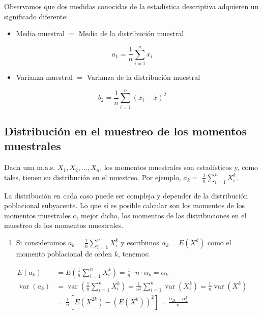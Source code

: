 \documentclass[
]{article}
\providecommand{\tightlist}{%
  \setlength{\itemsep}{0pt}\setlength{\parskip}{0pt}}
\begin{document}
Observamos que dos medidas conocidas de la estadística descriptiva adquieren un significado diferente:

\begin{itemize}
\tightlist
\item
  Media muestral \(=\) Media de la distribución muestral
\end{itemize}

\[
a_{1}=\frac{1}{n} \sum_{i=1}^{n} x_{i}
\]

\begin{itemize}
\tightlist
\item
  Varianza muestral \(=\) Varianza de la distribución muestral
\end{itemize}

\[
b_{2}=\frac{1}{n} \sum_{i=1}^{n}\left(x_{i}-\bar{x}\right)^{2}
\]

\subsection{Distribución en el muestreo de los momentos muestrales}\label{distribuciuxf3n-en-el-muestreo-de-los-momentos-muestrales}

Dada una m.a.s. \(X_{1}, X_{2}, \ldots, X_{n}\), los momentos muestrales son estadísticos y, como tales, tienen su distribución en el muestreo. Por ejemplo, \(a_{k}=\) \(\frac{1}{n} \sum_{i=1}^{n} X_{i}^{k}\).

La distribución en cada caso puede ser compleja y depender de la distribución poblacional subyacente.
Lo que sí es posible calcular son los momentos de los momentos muestrales o, mejor dicho, los momentos de las distribuciones en el muestreo de los momentos muestrales.

\begin{enumerate}
\def\labelenumi{\arabic{enumi}.}
\tightlist
\item
  Si consideramos \(a_{k}=\frac{1}{n} \sum_{i=1}^{n} X_{i}^{k}\) y escribimos \(\alpha_{k}=E\left(X^{k}\right)\) como el momento poblacional de orden \(k\), tenemos:
\end{enumerate}

\[
\begin{aligned}
E\left(a_{k}\right) & =E\left(\frac{1}{n} \sum_{i=1}^{n} X_{i}^{k}\right)=\frac{1}{n} \cdot n \cdot \alpha_{k}=\alpha_{k} \\
\operatorname{var}\left(a_{k}\right) & =\operatorname{var}\left(\frac{1}{n} \sum_{i=1}^{n} X_{i}^{k}\right)=\frac{1}{n^{2}} \sum_{i=1}^{n} \operatorname{var}\left(X_{i}^{k}\right)=\frac{1}{n} \operatorname{var}\left(X^{k}\right) \\
& =\frac{1}{n}\left[E\left(X^{2 k}\right)-\left(E\left(X^{k}\right)\right)^{2}\right]=\frac{\alpha_{2 k}-\alpha_{k}^{2}}{n}
\end{aligned}
\]
\end{document}

